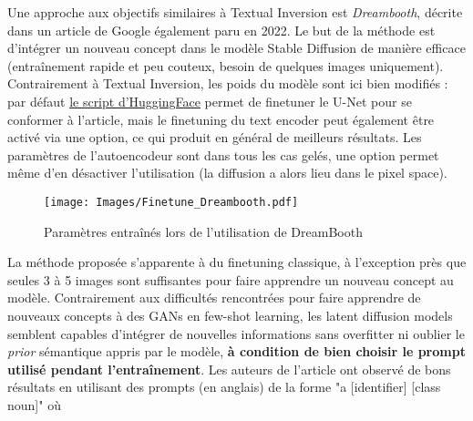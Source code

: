 \documentclass{article}
\begin{document}
Une approche aux objectifs similaires à Textual Inversion est \textit{Dreambooth}, décrite dans un article de Google \cite{Dreambooth} également paru en 2022. Le but de la méthode est d'intégrer un nouveau concept dans le modèle Stable Diffusion de manière efficace (entraînement rapide et peu couteux, besoin de quelques images uniquement). Contrairement à Textual Inversion, les poids du modèle sont ici bien modifiés : par défaut \href{https://github.com/huggingface/diffusers/tree/main/examples/dreambooth}{le script d'HuggingFace} permet de finetuner le U-Net pour se conformer à l'article, mais le finetuning du text encoder peut également être activé via une option, ce qui produit en général de meilleurs résultats. Les paramètres de l'autoencodeur sont dans tous les cas gelés, une option permet même d'en désactiver l'utilisation (la diffusion a alors lieu dans le pixel space).
\begin{figure}[H]
    \centering
    \texttt{[image: Images/Finetune\_Dreambooth.pdf]}
    \caption{Paramètres entraînés lors de l'utilisation de DreamBooth}
\end{figure}
\vspace{-0.5cm}
La méthode proposée s'apparente à du finetuning classique, à l'exception près que seules 3 à 5 images sont suffisantes pour faire apprendre un nouveau concept au modèle. Contrairement aux difficultés rencontrées pour faire apprendre de nouveaux concepts à des GANs en few-shot learning, les latent diffusion models semblent capables d'intégrer de nouvelles informations sans overfitter ni oublier le \textit{prior} sémantique appris par le modèle, \textbf{à condition de bien choisir le prompt utilisé pendant l'entraînement}. Les auteurs de l'article ont observé de bons résultats en utilisant des prompts (en anglais) de la forme "a [identifier] [class noun]" où
\end{document}
